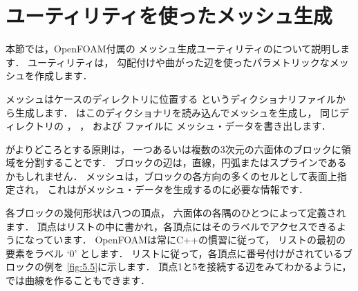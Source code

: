 \begin{table}[p]
\end{table}



\section{ユーティリティを使ったメッシュ生成}
\label{sec:5.3}
%
%
%
本節では，OpenFOAM付属の
メッシュ生成ユーティリティのについて説明します．
ユーティリティは，
%
勾配付けや曲がった辺を使ったパラメトリックなメッシュを作成します．

メッシュはケースのディレクトリに位置する
%
%
というディクショナリファイルから生成します．
はこのディクショナリを読み込んでメッシュを生成し，
同じディレクトリの
%
%
，
%
%
，
%
%
および
%
%
ファイルに
メッシュ・データを書き出します．

がよりどころとする原則は，
一つあるいは複数の3次元の六面体のブロックに領域を分割することです．
ブロックの辺は，直線，円弧またはスプラインであるかもしれません．
メッシュは，ブロックの各方向の多くのセルとして表面上指定され，
これはがメッシュ・データを生成するのに必要な情報です．

各ブロックの幾何形状は八つの頂点，
六面体の各隅のひとつによって定義されます．
頂点はリストの中に書かれ，各頂点にはそのラベルでアクセスできるようになっています．
OpenFOAMは常にC++の慣習に従って，
リストの最初の要素をラベル `0' とします．
リストに従って，各頂点に番号付けがされているブロックの例を
\autoref{fig:5.5}に示します．
頂点1と5を接続する辺をみてわかるように，
では曲線を作ることもできます．

